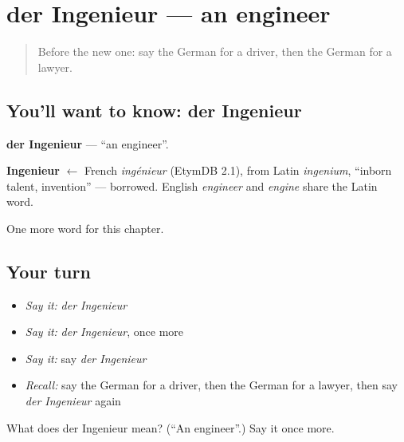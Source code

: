 \section[der Ingenieur]{der Ingenieur — an engineer}

\label{lesson:GE-C125-ingenieur}



\begin{quote}
Before the new one: say the German for a driver, then the German for a lawyer.
\end{quote}

\subsection*{You'll want to know: der Ingenieur}
\textbf{der Ingenieur} — \textquotedblleft{}an engineer\textquotedblright{}.

\begin{cousinweb}
\textbf{Ingenieur} $\leftarrow$ French \emph{ingénieur} (EtymDB 2.1), from Latin \emph{ingenium}, \textquotedblleft{}inborn talent, invention\textquotedblright{} — borrowed. English \emph{engineer} and \emph{engine} share the Latin word.
\end{cousinweb}

\begin{grammarlens}[title={What you've built}]
One more word for this chapter.
\end{grammarlens}

\subsection*{Your turn}
\begin{itemize}
\raggedright
  \item \emph{Say it:} \emph{der Ingenieur}
  \item \emph{Say it:} \emph{der Ingenieur}, once more
  \item \emph{Say it:} say \emph{der Ingenieur}
  \item \emph{Recall:} say the German for a driver, then the German for a lawyer, then say \emph{der Ingenieur} again
\end{itemize}

\begin{tcolorbox}[breakable,colback=teal!4,colframe=teal!35!black,title={Before you move on}]
What does der Ingenieur mean? (\textquotedblleft{}An engineer\textquotedblright{}.) Say it once more.
\end{tcolorbox}
